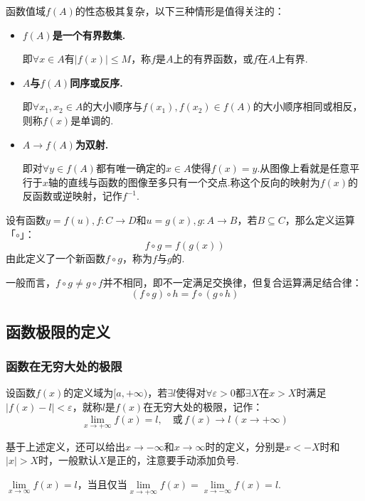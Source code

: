 函数值域$f(A)$的性态极其复杂，以下三种情形是值得关注的：
\begin{itemize}
    \item \textbf{$f(A)$是一个有界数集.}
    
    即$\forall x \in A$有$|f(x)|\leqslant M$，称$f$是$A$上的有界函数，或$f$在$A$上有界.
    \item \textbf{$A$与$f(A)$同序或反序.}
    
    即$\forall x_1, x_2 \in A$的大小顺序与$f(x_1),f(x_2)\in f(A)$的大小顺序相同或相反，则称$f(x)$是单调的.

    \item \textbf{$A \to f(A)$为双射.}
    
    即对$\forall y \in f(A)$都有唯一确定的$x \in A$使得$f(x)=y$.从图像上看就是任意平行于$x$轴的直线与函数的图像至多只有一个交点.称这个反向的映射为$f(x)$的反函数或逆映射，记作$f^{-1}$.
\end{itemize}
\begin{definition}
    设有函数$y=f(u),f:C \to D$和$u=g(x),g:A \to B$，若$B \subseteq C$，那么定义运算「$\circ$」：
    \[f \circ g = f(g(x))\]
    由此定义了一个新函数$f \circ g$，称为$f$与$g$的.
\end{definition}
一般而言，$f \circ g \neq g \circ f$并不相同，即不一定满足交换律，但复合运算满足结合律：
\[(f \circ g) \circ h = f \circ (g \circ h)\]

\subsection{函数极限的定义}
\subsubsection{函数在无穷大处的极限}
\begin{definition}
    设函数$f(x)$的定义域为$[a,+\infty)$，若$\exists l$使得对$\forall \varepsilon > 0$都$\exists X$在$x > X$时满足$|f(x) - l| < \varepsilon$，就称$l$是$f(x)$在无穷大处的极限，记作：
    \[\lim_{x\to+\infty}f(x)=l,\quad\text{或}\,f(x)\to l\,(x\to+\infty)\]
\end{definition}
基于上述定义，还可以给出$x\to-\infty$和$x\to\infty$时的定义，分别是$x<-X$时和$|x|>X$时，一般默认$X$是正的，注意要手动添加负号.

\begin{theorem}
    $\lim\limits_{x\to\infty}f(x)=l$，当且仅当$\lim\limits_{x\to+\infty}f(x) = \lim\limits_{x\to-\infty}f(x) = l$.
\end{theorem}

